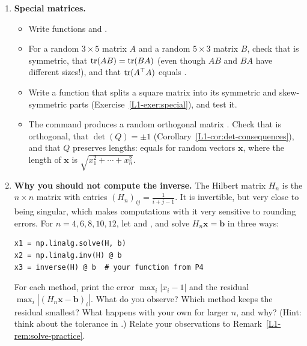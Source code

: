 \begin{enumerate}[label=\textbf{P\arabic*.}, leftmargin=*]
    \item \textbf{Special matrices.}
    \begin{itemize}
        \item Write functions  and .
        \item For a random $3 \times 5$ matrix $A$ and a random $5 \times 3$ matrix $B$, check that  is symmetric, that $\operatorname{tr}(AB) = \operatorname{tr}(BA)$ (even though $AB$ and $BA$ have different sizes!), and that $\operatorname{tr}(A^\top A)$ equals .
        \item Write a function that splits a square matrix into its symmetric and skew-symmetric parts (Exercise~\ref{L1-exer:special}), and test it.
        \item The command  produces a random orthogonal matrix . Check that  is orthogonal, that $\det(Q) = \pm 1$ (Corollary~\ref{L1-cor:det-consequences}), and that $Q$ preserves lengths:  equals  for random vectors $\mathbf{x}$, where the length of $\mathbf{x}$ is $\sqrt{x_1^2 + \cdots + x_n^2}$.
    \end{itemize}

    \item \textbf{Why you should not compute the inverse.} The Hilbert matrix $H_n$ is the $n \times n$ matrix with entries $(H_n)_{ij} = \frac{1}{i + j - 1}$. It is invertible, but very close to being singular, which makes computations with it very sensitive to rounding errors. For $n = 4, 6, 8, 10, 12$, let  and , and solve $H_n \mathbf{x} = \mathbf{b}$ in three ways:
\begin{lstlisting}
x1 = np.linalg.solve(H, b)
x2 = np.linalg.inv(H) @ b
x3 = inverse(H) @ b  # your function from P4
\end{lstlisting}
    For each method, print the error $\max_i |x_i - 1|$ and the residual $\max_i |(H_n \mathbf{x} - \mathbf{b})_i|$. What do you observe? Which method keeps the residual smallest? What happens with your own  for larger $n$, and why? (Hint: think about the tolerance in .) Relate your observations to Remark~\ref{L1-rem:solve-practice}.


\end{enumerate}
